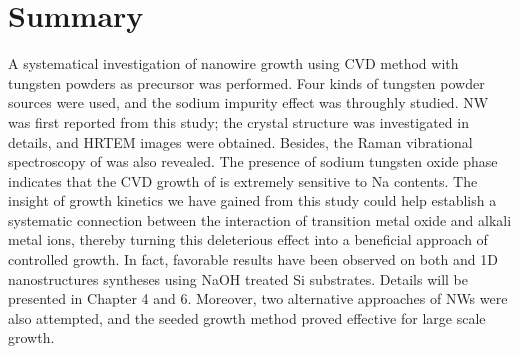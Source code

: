 
\section{Summary}

A systematical investigation of  nanowire growth using CVD method with tungsten powders as precursor was performed. Four kinds of tungsten powder sources were used, and the sodium impurity effect was throughly studied.  NW was first reported from this study; the crystal structure was investigated in details, and HRTEM images were obtained. Besides, the Raman vibrational spectroscopy of  was also revealed. The presence of sodium tungsten oxide phase indicates that the CVD growth of  is extremely sensitive to Na contents. The insight of  growth kinetics we have gained from this study could help establish a systematic connection between the interaction of transition metal oxide and alkali metal ions, thereby turning this deleterious effect into a beneficial approach of controlled growth. In fact, favorable results have been observed on both  and  1D nanostructures syntheses using NaOH treated Si substrates. Details will be presented in Chapter 4 and 6. Moreover, two alternative approaches of  NWs were also attempted, and the seeded growth method proved effective for large scale growth. 



